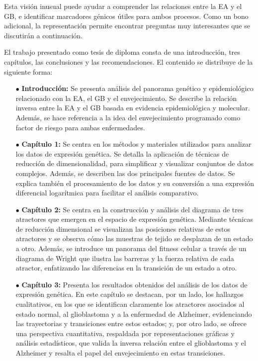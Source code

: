 Esta visión inusual puede ayudar a comprender las relaciones entre la EA y el GB, e identificar marcadores génicos útiles para ambos procesos. Como un bono adicional, la representación permite encontrar preguntas muy interesantes que se discutirán a continuación.

El trabajo presentado como tesis de diploma consta de una introducción, tres capítulos, las conclusiones y las recomendaciones. El contenido se distribuye de la siguiente forma:

\begin{itemize}
	\item[$\bullet$] \textbf{Introducción:} Se presenta análisis del panorama genético y epidemiológico relacionado con la EA, el GB y el envejecimiento. Se describe la relación inversa entre la EA y el GB basada en evidencia epidemiológica y molecular. Además, se hace referencia a la idea del envejecimiento programado como factor de riesgo para ambas enfermedades.
	
	\item[$\bullet$] \textbf{Capítulo 1:} Se centra en los métodos y materiales utilizados para analizar los datos de expresión genética. Se detalla la aplicación de técnicas de reducción de dimensionalidad, para simplificar y visualizar conjuntos de datos complejos. Además, se describen las dos principales fuentes de datos. Se explica también el procesamiento de los datos y su conversión a una expresión diferencial logarítmica para facilitar el análisis comparativo.
	
	\item[$\bullet$] \textbf{Capítulo 2:} Se centra en la construcción y análisis del diagrama de tres atractores que emergen en el espacio de expresión genética. Mediante técnicas de reducción dimensional se visualizan las posiciones relativas de estos atractores y se observa cómo las muestras de tejido se desplazan de un estado a otro. Además, se introduce un panorama del fitness celular a través de un diagrama de Wright que ilustra las barreras y la fuerza relativa de cada atractor, enfatizando las diferencias en la transición de un estado a otro.
	
	\item[$\bullet$] \textbf{Capítulo 3:} Presenta los resultados obtenidos del análisis de los datos de expresión genética. En este capítulo se destacan, por un lado, los hallazgos cualitativos, en los que se identifican claramente los atractores asociados al estado normal, al glioblastoma y a la enfermedad de Alzheimer, evidenciando las trayectorias y transiciones entre estos estados; y, por otro lado, se ofrece una perspectiva cuantitativa, respaldada por representaciones gráficas y análisis estadísticos, que valida la inversa relación entre el glioblastoma y el Alzheimer y resalta el papel del envejecimiento en estas transiciones.
	

\end{itemize}
